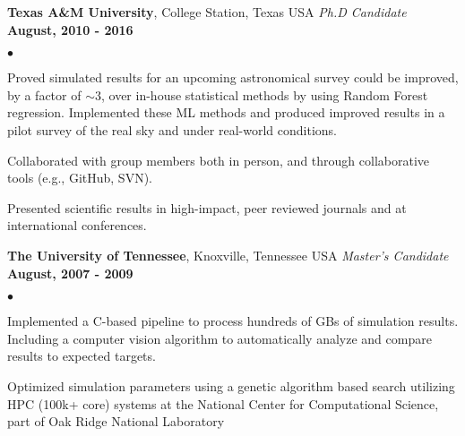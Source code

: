 \documentclass[margin,line, 11pt]{res}
\newenvironment{list2}{
  \begin{list}{$\bullet$}{%
      \setlength{\itemsep}{0in}
      \setlength{\parsep}{0in} \setlength{\parskip}{0in}
      \setlength{\topsep}{0in} \setlength{\partopsep}{0in}
      \setlength{\leftmargin}{0.2in}}}{\end{list}}
\begin{document}
\begin{resume}
\textbf{Texas A\&M University}, College Station, Texas USA\newline
\textit{Ph.D Candidate} \hfill \textbf{August, 2010 - 2016}\newline
    \begin{list2}
    	\vspace*{-5mm}
      \item Proved simulated results for an upcoming astronomical survey could be improved, by a factor of $\sim3$, over in-house statistical methods by using Random Forest regression. Implemented these ML methods and produced improved results in a pilot survey of the real sky and under real-world conditions.
    	\item Collaborated with group members both in person, and through collaborative tools (e.g., GitHub, SVN).
    	\item Presented scientific results in high-impact, peer reviewed journals and at international conferences.
    \end{list2}
\vspace*{-3mm}

\textbf{The University of Tennessee}, Knoxville, Tennessee USA\newline
\textit{Master's Candidate} \hfill \textbf{August, 2007 - 2009}\newline
    \begin{list2}
    	\vspace*{-5mm}
      \item Implemented a C-based pipeline to process hundreds of GBs of simulation results. Including a computer vision algorithm to automatically analyze and compare results to expected targets.
      \item Optimized simulation parameters using a genetic algorithm based search utilizing HPC (100k+ core) systems at the National Center for Computational Science, part of Oak Ridge National Laboratory
    \end{list2}
\vspace*{-3mm}



\end{resume}
\end{document}
